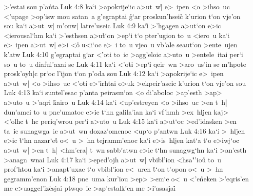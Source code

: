 >'estai
sou
p'a\r{n}ta\bibvsend
{}
\vs Luk 4:8
ka`i
>apokrije`ic
a>ut~w|\r{}
e>~ipen
<o
>ihso~uc
<'upage
>op'isw
mou
satan~a
g'egraptai
\r{g}`ar
proskun'hseic\r{}
k'urion
t`on
vje'on
sou
ka`i
a>ut~w|
m'onw|
latre'useic\bibvsend
\vs Luk 4:9
ka`i\r{}
>'hgagen
a>ut`on
e>ic
<ierousal`hm
ka`i
>'esthsen
a>u\r{t}`on
>ep`i
t`o
pter'ugion
to~u
<iero~u
ka`i
e>~ipen
a>ut~w|
e>i
<o\r{}
u<i`oc
e>~i
to~u
vjeo~u
vb'ale
seaut`on
>ente~ujen
k'atw\bibvsend
\vs Luk 4:10
g'egraptai
g`ar
<'oti
to~ic
>agg'eloic
a>uto~u
>entele~itai
per`i
so~u
to~u
diaful'axai
se\bibvsend
\vs Luk 4:11
ka`i
<'o\r{t}i
>ep`i
qeir~wn
>aro~us'in
se
m'hpote
prosk'oyh|c
pr`oc
l'ijon
t`on
p'oda
sou\bibvsend
\vs Luk 4:12
ka`i
>apokrije`ic
e>~ipen
a>ut~w|
<o
>ihso~uc
<'oti
e>'irhtai
o>uk
>ekpeir'aseic
k'urion
t`on
vje'on
sou\bibvsend
\vs Luk 4:13
ka`i
suntel'esac
p'anta
peirasm`on
<o
di'aboloc
>ap'esth
>ap>
a>uto~u
>'aqri
\r{k}airo~u\bibvsend
{}
\vs Luk 4:14
ka`i
<up'estreyen
<o
>ihso~uc
>en
t~h|
dun'amei
to~u
pne'umatoc
e>ic
t`hn
galila'ian
ka`i
vf'hmh
>ex~hljen
kaj>
<'olhc
t~hc
periq'wrou
per`i
a>uto~u\bibvsend
\vs Luk 4:15
ka`i
a>ut`oc
>ed'idasken
>en
ta~ic
sunagwga~ic
a>ut~wn
doxaz'omenoc
<up`o
p'antwn\bibvsend
\vs Luk 4:16
ka`i
>~hljen
e>ic
\r{t}`hn
nazar`e\r{t}
o<~u
>~hn
tejramm'enoc
ka`i
e>is~hljen
kat`a
t`o
e>iwj`oc
a>ut~w|
>en
t~h|
<hm'era|
t~wn
sabb'atwn
e>ic
t`hn
sunagwg`hn
ka`i
>an'esth
>anagn~wnai\bibvsend
\vs Luk 4:17
ka`i
>eped'ojh
a>ut~w|
vbibl'ion
<hsa"'iou\r{}
to~u
prof'htou
ka`i
>anapt'uxac
t`o
vbibl'ion
e<~uren
\r{t}`on
t'opon
o<~u
>~hn
gegramm'enon\bibvsend
\vs Luk 4:18
pne~uma
kur'iou
>ep>
>em`e
o<~u
<'e\r{n}eken
>'eqris'en
me
e>uaggel'iz\r{e}sjai
ptwqo~ic
>ap'estalk'en
me
>i'asasjai\r{}
